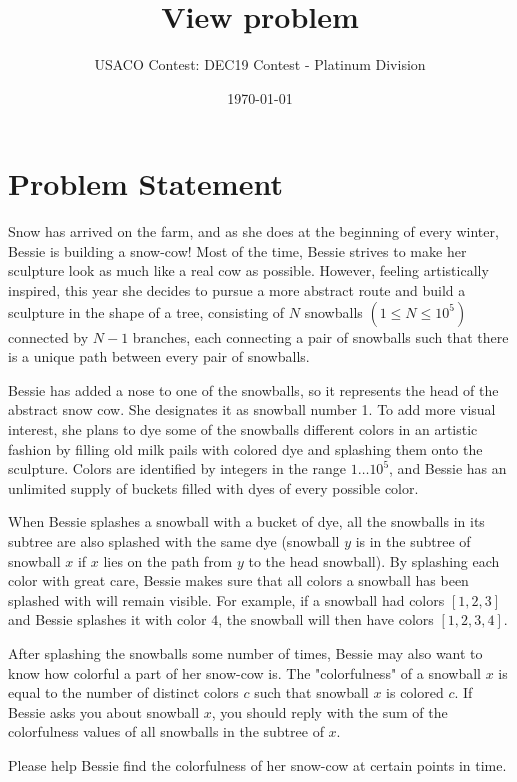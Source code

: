 \documentclass[12pt]{article}
\title{View problem}
\author{USACO Contest: DEC19 Contest - Platinum Division}
\date{\today}
\begin{document}
\maketitle

\section*{Problem Statement}

Snow has arrived on the farm, and as she does at the beginning of every winter,
Bessie is building a snow-cow! Most of the time, Bessie strives to make her
sculpture look as much like a real cow as possible.  However, feeling
artistically inspired, this year she decides to pursue a more abstract route and
build a sculpture in the shape of a tree, consisting of $N$ snowballs
$(1\le N\le 10^5)$ connected by  $N-1$ branches, each connecting a pair of
snowballs such that there is a  unique path between every pair of snowballs. 

Bessie has added a nose to one of the snowballs, so it represents the head of
the abstract snow cow.  She designates it as snowball number 1.  To add more
visual interest, she plans to dye some of the snowballs different colors in an
artistic fashion by filling old milk pails with colored dye and splashing them
onto the sculpture.  Colors are identified by integers in the range
$1 \ldots 10^5$, and  Bessie has an unlimited supply of buckets filled with dyes
of every possible color.

When Bessie splashes a snowball with a bucket of dye, all the snowballs in its 
subtree are also splashed with the same dye (snowball $y$ is in the subtree of
snowball $x$ if $x$ lies on the path from $y$ to the head snowball). By
splashing each color with great care, Bessie makes sure that all colors a 
snowball has been splashed with will remain visible. For example, if a snowball
had colors $[1,2,3]$ and Bessie splashes it with color $4$, the snowball will
then have colors $[1,2,3,4]$. 

After splashing the snowballs some number of times, Bessie may also want to know
how colorful a part of her snow-cow is.  The "colorfulness" of a snowball $x$ is
equal to the number of distinct colors $c$ such that snowball $x$ is colored
$c$. If Bessie asks you about snowball $x$, you should reply with the sum of the
colorfulness values of all snowballs in the subtree of $x.$

Please help Bessie find the colorfulness of her snow-cow at certain points in
time.
\end{document}
